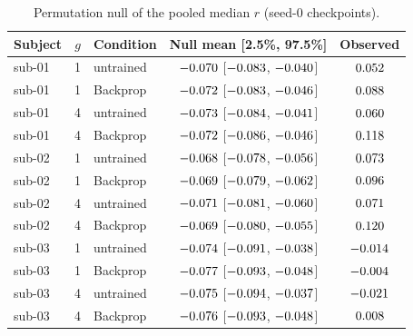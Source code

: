 \begin{table}[h]
\centering
\footnotesize
\setlength{\tabcolsep}{3pt}
\begin{tabular}{@{}lclcc@{}}
\toprule
Subject & $g$ & Condition & Null mean [2.5\%, 97.5\%] & Observed \\
\midrule
sub-01 & 1 & untrained & $-0.070$ [$-0.083$, $-0.040$] & $0.052$ \\
sub-01 & 1 & Backprop & $-0.072$ [$-0.083$, $-0.046$] & $0.088$ \\
sub-01 & 4 & untrained & $-0.073$ [$-0.084$, $-0.041$] & $0.060$ \\
sub-01 & 4 & Backprop & $-0.072$ [$-0.086$, $-0.046$] & $0.118$ \\
sub-02 & 1 & untrained & $-0.068$ [$-0.078$, $-0.056$] & $0.073$ \\
sub-02 & 1 & Backprop & $-0.069$ [$-0.079$, $-0.062$] & $0.096$ \\
sub-02 & 4 & untrained & $-0.071$ [$-0.081$, $-0.060$] & $0.071$ \\
sub-02 & 4 & Backprop & $-0.069$ [$-0.080$, $-0.055$] & $0.120$ \\
sub-03 & 1 & untrained & $-0.074$ [$-0.091$, $-0.038$] & $-0.014$ \\
sub-03 & 1 & Backprop & $-0.077$ [$-0.093$, $-0.048$] & $-0.004$ \\
sub-03 & 4 & untrained & $-0.075$ [$-0.094$, $-0.037$] & $-0.021$ \\
sub-03 & 4 & Backprop & $-0.076$ [$-0.093$, $-0.048$] & $0.008$ \\
\bottomrule
\end{tabular}
\caption{Permutation null of the pooled median $r$ (seed-0 checkpoints).}
\label{tab:permnull}
\end{table}

